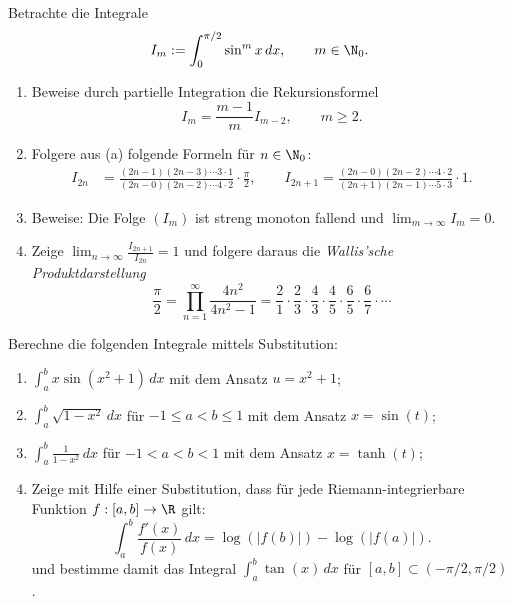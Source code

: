 \begin{prob}
Betrachte die Integrale
$$
   I_m := \int_0^{\pi/2}\sin^mx\,dx,\qquad m\in\N_0.
$$
\begin{enumerate}[label=(\alph*)]
\item Beweise durch partielle Integration die Rekursionsformel
$$
   I_m = \frac{m-1}{m}I_{m-2},\qquad m\geq 2.
$$
\item Folgere aus (a) folgende Formeln f\"ur $n\in\N_0$:
\begin{align*}
   I_{2n} &= \frac{(2n-1)(2n-3)\cdots 3\cdot 1}{(2n-0)(2n-2)\cdots 4\cdot 2}\cdot\frac{\pi}{2},\qquad
   I_{2n+1} = \frac{(2n-0)(2n-2)\cdots 4\cdot 2}{(2n+1)(2n-1)\cdots 5\cdot 3}\cdot 1.
\end{align*}
\item Beweise: 
Die Folge $(I_m)$ ist streng monoton fallend und $\lim_{m\to\infty}I_m=0$.
\item Zeige $\lim_{n\to\infty}\frac{I_{2n+1}}{I_{2n}}=1$ und folgere
daraus die {\em Wallis'sche Produktdarstellung}
$$
   \frac{\pi}{2} = \prod_{n=1}^\infty \frac{4n^2}{4n^2-1} = \frac{2}{1} \cdot \frac{2}{3} \cdot \frac{4}{3} \cdot \frac{4}{5} \cdot \frac{6}{5} \cdot \frac{6}{7} \cdot \cdots
$$
\end{enumerate}
\end{prob}

\vspace{0.3cm}

\begin{prob}
Berechne die folgenden Integrale mittels Substitution:
\begin{enumerate}[label=(\alph*)]
\item $\int_a^b x\sin(x^2+1)\,dx$ mit dem Ansatz $u=x^2+1$;
\item $\int_a^b \sqrt{1-x^2}\,dx$ f\"ur $-1\leq a<b\leq1$ mit dem Ansatz $x=\sin(t)$;
\item $\int_a^b\frac{1}{1-x^2}\,dx$ f\"ur $-1<a<b<1$ mit dem Ansatz $x=\tanh(t)$;
\item Zeige mit Hilfe einer Substitution, dass für jede Riemann-integrierbare Funktion $f:[a,b]\to\R$ gilt:
$$
\int_a^b\frac{f'(x)}{f(x)}\,dx = \log(|f(b)|)- \log(|f(a)|).
$$
 und bestimme damit das Integral $\int_a^b\tan(x)\,dx$ für $[a,b]\subset(-\pi/2,\pi/2)$.
\end{enumerate} 
\end{prob}

